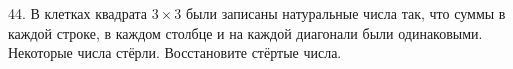 44. В клетках квадрата $3\times3$ были записаны натуральные числа так, что суммы в каждой строке, в каждом столбце и на каждой диагонали были одинаковыми. Некоторые числа стёрли. Восстановите стёртые числа.
\begin{center}
\begin{figure}[ht!]
\end{figure}
\end{center}
